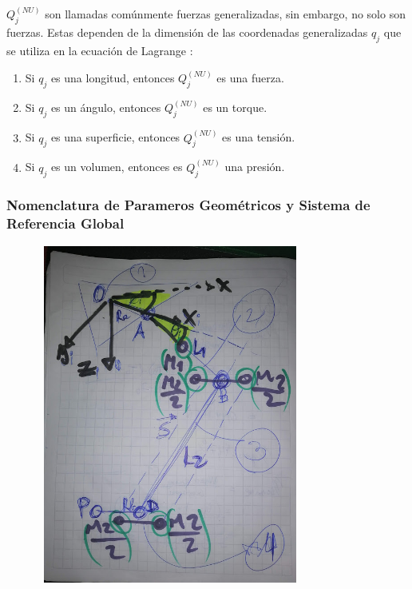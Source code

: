     \newpage
    
    
     $ Q_{j}^{ \left( NU \right) }$ son llamadas comúnmente fuerzas generalizadas, sin embargo, no solo son fuerzas. Estas dependen de la dimensión de las coordenadas generalizadas  $ q_{j}$ que se utiliza en la ecuación de Lagrange :
    
    \begin{enumerate}
    	\item Si $q_{j}$  es una longitud, entonces $Q_{j}^{ \left( NU \right)}$  es una fuerza.
    	\item Si  $q_{j}$  es un ángulo, entonces  $Q_{j}^{ \left( NU \right) }$  es un torque.
        \item Si  $q_{j}$  es una superficie, entonces  $Q_{j}^{ \left( NU \right) }$ es una tensión.
    	\item Si $q_{j}$ es un volumen, entonces es $Q_{j}^{ \left( NU \right) }$ una presión.
    \end{enumerate}

    \newpage


    \subsubsection{Nomenclatura de Parameros Geométricos y Sistema de Referencia Global}
    
        \begin{figure}[H]
    		    \includegraphics[width=3.43in,height=4.39in]{Main/Chapter4/Images4/ma_dina_1.png}
        \end{figure}

